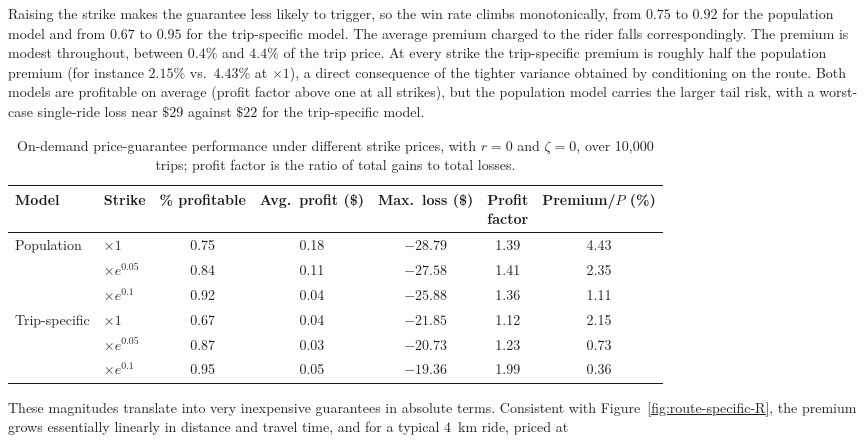 \documentclass[12pt]{article}
\begin{document}
{{{{{{{{Raising the strike makes the guarantee less likely to trigger, so the win rate climbs monotonically, from $0.75$ to $0.92$ for the population model and from $0.67$ to $0.95$ for the trip-specific model. The average premium charged to the rider falls correspondingly. The premium is modest throughout, between $0.4\%$ and $4.4\%$ of the trip price. At every strike the trip-specific premium is roughly half the population premium (for instance $2.15\%$ vs.\ $4.43\%$ at $\times 1$), a direct consequence of the tighter variance obtained by conditioning on the route. Both models are profitable on average (profit factor above one at all strikes), but the population model carries the larger tail risk, with a worst-case single-ride loss near $\$29$ against $\$22$ for the trip-specific model.

 \begin{table}[h!]
    \centering
    \caption{On-demand price-guarantee performance under different strike prices,
    with $r=0$ and $\zeta=0$, over 10{,}000 trips;
    profit factor is the ratio of total gains to total losses.}
    \begin{tabular}{l l c c c c c}
    \hline
    Model & Strike & \% profitable & \shortstack{Avg.\ profit\\(\$)} & \shortstack{Max.\ loss\\(\$)} &
    \shortstack{Profit\\factor} & Premium/$P$ (\%) \\
    \hline
    Population    & $\times 1$        & 0.75 & 0.18 & $-28.79$ & 1.39 & 4.43 \\
                  & $\times e^{0.05}$ & 0.84 & 0.11 & $-27.58$ & 1.41 & 2.35 \\
                  & $\times e^{0.1}$  & 0.92 & 0.04 & $-25.88$ & 1.36 & 1.11 \\
    Trip-specific & $\times 1$        & 0.67 & 0.04 & $-21.85$ & 1.12 & 2.15 \\
                  & $\times e^{0.05}$ & 0.87 & 0.03 & $-20.73$ & 1.23 & 0.73 \\
                  & $\times e^{0.1}$  & 0.95 & 0.05 & $-19.36$ & 1.99 & 0.36 \\
    \hline
    \end{tabular}
    \label{tab:strike-metrics}
\end{table}
These magnitudes translate into very inexpensive guarantees in absolute terms. Consistent with
Figure~\ref{fig:route-specific-R}, the premium grows essentially linearly in distance and
travel time, and for a typical $4$~km ride, priced at
}}}}}}}}
\end{document}
